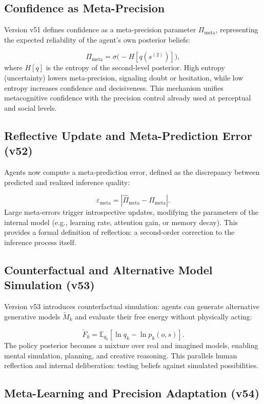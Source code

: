 \documentclass[9pt]{elife}
\begin{document}
\subsection{Confidence as Meta-Precision}

Version v51 defines confidence as a meta-precision parameter
$\Pi_{\mathrm{meta}}$, representing the expected reliability of
the agent’s own posterior beliefs:

\[
\Pi_{\mathrm{meta}} = \sigma\!\big( -H[q(s^{(2)})] \big),
\]
where $H[q]$ is the entropy of the second-level posterior.
High entropy (uncertainty) lowers meta-precision,
signaling doubt or hesitation,
while low entropy increases confidence and decisiveness.
This mechanism unifies metacognitive confidence with
the precision control already used at perceptual and social levels.

\subsection{Reflective Update and Meta-Prediction Error (v52)}

Agents now compute a meta-prediction error,
defined as the discrepancy between predicted and realized inference quality:

\[
\varepsilon_{\mathrm{meta}} =
|\widehat{\Pi}_{\mathrm{meta}} - \Pi_{\mathrm{meta}}|.
\]
Large meta-errors trigger introspective updates,
modifying the parameters of the internal model
(e.g., learning rate, attention gain, or memory decay).
This provides a formal definition of reflection:
a second-order correction to the inference process itself.

\subsection{Counterfactual and Alternative Model Simulation (v53)}

Version v53 introduces counterfactual simulation:
agents can generate alternative generative models
$\tilde{M}_k$ and evaluate their free energy
without physically acting:

\[
\tilde{F}_k = \mathbb{E}_{q_k}[\ln q_k - \ln p_k(o, s)].
\]
The policy posterior becomes a mixture over real and imagined models,
enabling mental simulation, planning, and creative reasoning.
This parallels human reflection and internal deliberation:
testing beliefs against simulated possibilities.

\subsection{Meta-Learning and Precision Adaptation (v54)}
\end{document}
